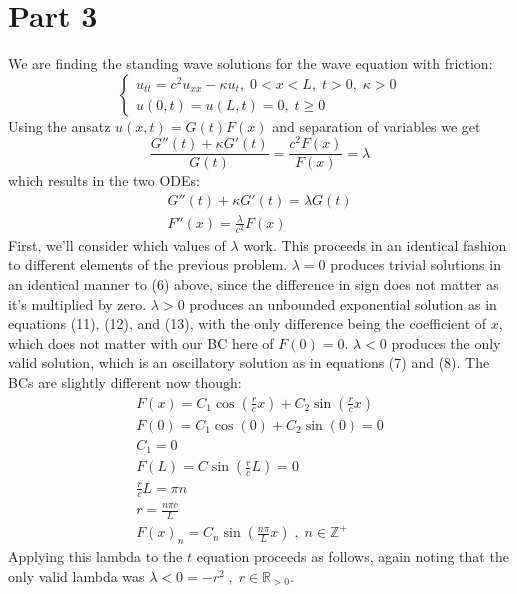 \documentclass{article}
\begin{document}
\section*{Part 3}
We are finding the standing wave solutions for the wave equation with friction:
\[
  \begin{cases}
			u_{tt} = c^2u_{xx} - \kappa u_t ,\;  0 < x < L ,\;  t> 0 ,\;  \kappa >0\\                
			u(0,t) = u(L,t) = 0, \;  t \geq 0
            \end{cases}
\]
Using the ansatz $u(x,t) = G(t)F(x)$ and separation of variables we get 
\begin{equation}
\frac{G''(t) + \kappa G'(t)}{G(t)} = \frac{c^2F(x)}{F(x)} = \lambda
\end{equation}
which results in the two ODEs:
\begin{equation}
\begin{aligned}
G''(t) + \kappa G'(t) = \lambda G(t)\\
F''(x) = \frac{\lambda}{c^2}F(x)
\end{aligned}
\end{equation}
First, we'll consider which values of $\lambda$ work. This proceeds in an identical fashion to different elements of the previous problem. $\lambda = 0$ produces trivial solutions in an identical manner to (6) above, since the difference in sign does not matter as it's multiplied by zero. $\lambda >0$ produces an unbounded exponential solution as in equations (11), (12), and (13), with the only difference being the coefficient of $x$, which does not matter with our BC here of $F(0) = 0$. $\lambda < 0$ produces the only valid solution, which is an oscillatory solution as in equations (7) and (8). The BCs are slightly different now though:
\begin{equation}
\begin{aligned}
F(x) = C_1\cos(\frac{r}{c}x) + C_2\sin(\frac{r}{c}x)\\
F(0) = C_1\cos(0) + C_2\sin(0)= 0\\
C_1 = 0\\
F(L) = C\sin(\frac{r}{c}L) = 0\\
\frac{r}{c}L = \pi n\\
r = \frac{n\pi c}{L}\\
F(x)_n =  C_n\sin(\frac{n\pi}{L}x) \; , \; n \in \mathbb{Z}^+
\end{aligned}
\end{equation} 
Applying this lambda to the $t$ equation proceeds as follows, again noting that the only valid lambda was $\lambda < 0 = -r^2 \; , \; r \in \mathbb{R}_{>0}$. 
\end{document}
